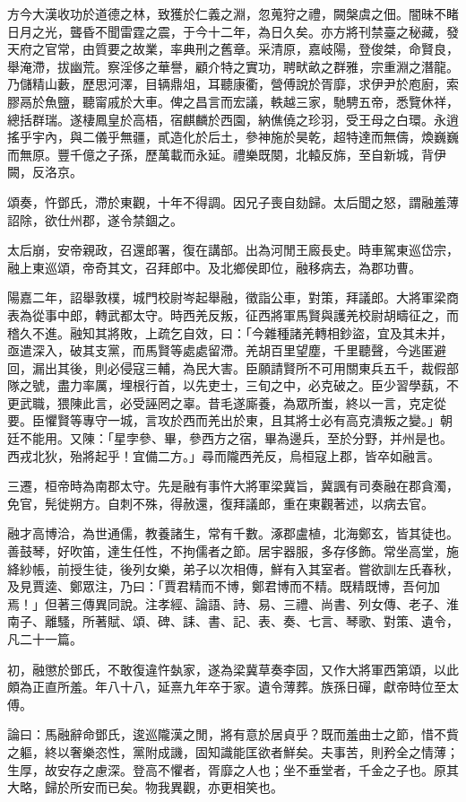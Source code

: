\begin{pinyinscope}
方今大漢收功於道德之林，致獲於仁義之淵，忽蒐狩之禮，闕槃虞之佃。闇昧不睹日月之光，聾昏不聞雷霆之震，于今十二年，為日久矣。亦方將刊禁臺之秘藏，發天府之官常，由質要之故業，率典刑之舊章。采清原，嘉岐陽，登俊桀，命賢良，舉淹滯，拔幽荒。察淫侈之華譽，顧介特之實功，聘畎畝之群雅，宗重淵之潛龍。乃儲精山藪，歷思河澤，目辆鼎俎，耳聽康衢，營傅說於胥靡，求伊尹於庖廚，索膠鬲於魚鹽，聽甯戚於大車。俾之昌言而宏議，軼越三家，馳騁五帝，悉覽休祥，總括群瑞。遂棲鳳皇於高梧，宿麒麟於西園，納僬僥之珍羽，受王母之白環。永逍搖乎宇內，與二儀乎無疆，貳造化於后土，參神施於昊乾，超特達而無儔，煥巍巍而無原。豐千億之子孫，歷萬載而永延。禮樂既闋，北轅反旆，至自新城，背伊闕，反洛京。

頌奏，忤鄧氏，滯於東觀，十年不得調。因兄子喪自劾歸。太后聞之怒，謂融羞薄詔除，欲仕州郡，遂令禁錮之。

太后崩，安帝親政，召還郎署，復在講部。出為河閒王廄長史。時車駕東巡岱宗，融上東巡頌，帝奇其文，召拜郎中。及北鄉侯即位，融移病去，為郡功曹。

陽嘉二年，詔舉敦樸，城門校尉岑起舉融，徵詣公車，對策，拜議郎。大將軍梁商表為從事中郎，轉武都太守。時西羌反叛，征西將軍馬賢與護羌校尉胡疇征之，而稽久不進。融知其將敗，上疏乞自效，曰：「今雜種諸羌轉相鈔盜，宜及其未并，亟遣深入，破其支黨，而馬賢等處處留滯。羌胡百里望塵，千里聽聲，今逃匿避回，漏出其後，則必侵寇三輔，為民大害。臣願請賢所不可用關東兵五千，裁假部隊之號，盡力率厲，埋根行首，以先吏士，三旬之中，必克破之。臣少習學蓺，不更武職，猥陳此言，必受誣罔之辜。昔毛遂廝養，為眾所蚩，終以一言，克定從要。臣懼賢等專守一城，言攻於西而羌出於東，且其將士必有高克潰叛之變。」朝廷不能用。又陳：「星孛參、畢，參西方之宿，畢為邊兵，至於分野，并州是也。西戎北狄，殆將起乎！宜備二方。」尋而隴西羌反，烏桓寇上郡，皆卒如融言。

三遷，桓帝時為南郡太守。先是融有事忤大將軍梁冀旨，冀諷有司奏融在郡貪濁，免官，髡徙朔方。自刺不殊，得赦還，復拜議郎，重在東觀著述，以病去官。

融才高博洽，為世通儒，教養諸生，常有千數。涿郡盧植，北海鄭玄，皆其徒也。善鼓琴，好吹笛，達生任性，不拘儒者之節。居宇器服，多存侈飾。常坐高堂，施絳紗帳，前授生徒，後列女樂，弟子以次相傳，鮮有入其室者。嘗欲訓左氏春秋，及見賈逵、鄭眾注，乃曰：「賈君精而不博，鄭君博而不精。既精既博，吾何加焉！」但著三傳異同說。注孝經、論語、詩、易、三禮、尚書、列女傳、老子、淮南子、離騷，所著賦、頌、碑、誄、書、記、表、奏、七言、琴歌、對策、遺令，凡二十一篇。

初，融懲於鄧氏，不敢復違忤埶家，遂為梁冀草奏李固，又作大將軍西第頌，以此頗為正直所羞。年八十八，延熹九年卒于家。遺令薄葬。族孫日磾，獻帝時位至太傅。

論曰：馬融辭命鄧氏，逡巡隴漢之閒，將有意於居貞乎？既而羞曲士之節，惜不貲之軀，終以奢樂恣性，黨附成譏，固知識能匡欲者鮮矣。夫事苦，則矜全之情薄；生厚，故安存之慮深。登高不懼者，胥靡之人也；坐不垂堂者，千金之子也。原其大略，歸於所安而已矣。物我異觀，亦更相笑也。


\end{pinyinscope}